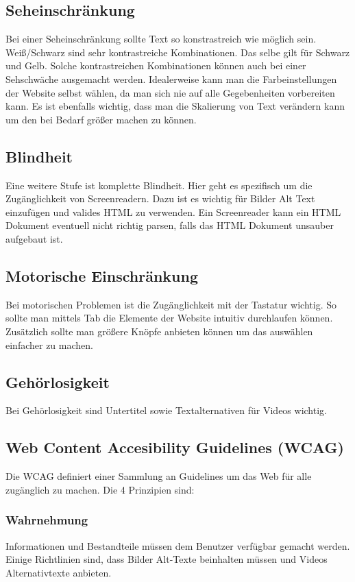 \documentclass{article}
\begin{document}
	\subsection{Seheinschränkung}
	Bei einer Seheinschränkung sollte Text so konstrastreich wie möglich sein. Weiß/Schwarz sind sehr kontrastreiche Kombinationen. Das selbe gilt für Schwarz und Gelb. Solche kontrastreichen Kombinationen können auch bei einer Sehschwäche ausgemacht werden. Idealerweise kann man die Farbeinstellungen der Website selbst wählen, da man sich nie auf alle Gegebenheiten vorbereiten kann. Es ist ebenfalls wichtig, dass man die Skalierung von Text verändern kann um den bei Bedarf größer machen zu können.
	\subsection{Blindheit}
	Eine weitere Stufe ist komplette Blindheit. Hier geht es spezifisch um die Zugänglichkeit von Screenreadern. Dazu ist es wichtig für Bilder Alt Text einzufügen und valides HTML zu verwenden. Ein Screenreader kann ein HTML Dokument eventuell nicht richtig parsen, falls das HTML Dokument unsauber aufgebaut ist.
	\subsection{Motorische Einschränkung}
	Bei motorischen Problemen ist die Zugänglichkeit mit der Tastatur wichtig. So sollte man mittels Tab die Elemente der Website intuitiv durchlaufen können. Zusätzlich sollte man größere Knöpfe anbieten können um das auswählen einfacher zu machen.
	\subsection{Gehörlosigkeit}
	Bei Gehörlosigkeit sind Untertitel sowie Textalternativen für Videos wichtig.
	\subsection{Web Content Accesibility Guidelines (WCAG)}
	Die WCAG definiert einer Sammlung an Guidelines um das Web für alle zugänglich zu machen. Die 4 Prinzipien sind:
	\subsubsection{Wahrnehmung}
	Informationen und Bestandteile müssen dem Benutzer verfügbar gemacht werden. Einige Richtlinien sind, dass Bilder Alt-Texte beinhalten müssen und Videos Alternativtexte anbieten.
\end{document}
